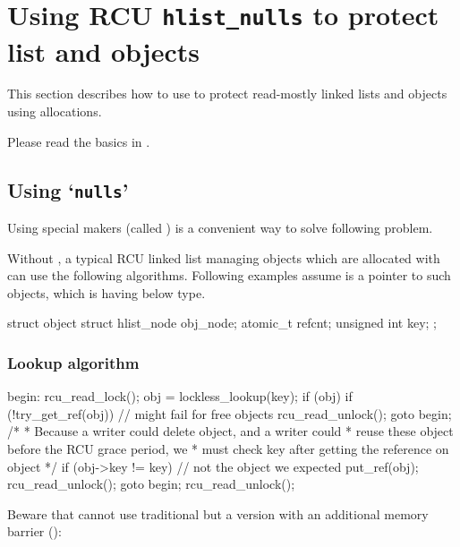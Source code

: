 
\section{Using RCU \texttt{hlist\_nulls} to protect list and objects}
\label{sec:rcu:Using RCU hlist_nulls to protect list and objects}

This section describes how to use  to
protect read-mostly linked lists and
objects using  allocations.

Please read the basics in .

\subsection{Using `\texttt{nulls}'}
\label{sec:rcu:Using nulls}

Using special makers (called ) is a convenient way
to solve following problem.

Without , a typical RCU linked list managing objects which are
allocated with   can use the following
algorithms.
Following examples assume  is a pointer to such
objects, which is having below type.

\begin{VerbatimU}
	struct object {
		struct hlist_node obj_node;
		atomic_t refcnt;
		unsigned int key;
	};
\end{VerbatimU}

\subsubsection{Lookup algorithm}

\begin{VerbatimU}
	begin:
	rcu_read_lock();
	obj = lockless_lookup(key);
	if (obj) {
		if (!try_get_ref(obj)) { // might fail for free objects
			rcu_read_unlock();
			goto begin;
		}
		/*
		 * Because a writer could delete object, and a writer could
		 * reuse these object before the RCU grace period, we
		 * must check key after getting the reference on object
		 */
		if (obj->key != key) { // not the object we expected
			put_ref(obj);
			rcu_read_unlock();
			goto begin;
		}
	}
	rcu_read_unlock();
\end{VerbatimU}

Beware that  cannot use traditional 
but a version with an additional memory barrier ():


